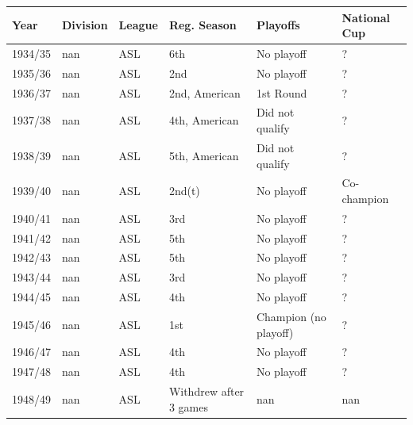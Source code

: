 \documentclass{article}
\begin{document}
\begin{tabular}{llllll}
\toprule
Year & Division & League & Reg. Season & Playoffs & National Cup \\
\midrule
1934/35 & nan & ASL & 6th & No playoff & ? \\
1935/36 & nan & ASL & 2nd & No playoff & ? \\
1936/37 & nan & ASL & 2nd, American & 1st Round & ? \\
1937/38 & nan & ASL & 4th, American & Did not qualify & ? \\
1938/39 & nan & ASL & 5th, American & Did not qualify & ? \\
1939/40 & nan & ASL & 2nd(t) & No playoff & Co-champion \\
1940/41 & nan & ASL & 3rd & No playoff & ? \\
1941/42 & nan & ASL & 5th & No playoff & ? \\
1942/43 & nan & ASL & 5th & No playoff & ? \\
1943/44 & nan & ASL & 3rd & No playoff & ? \\
1944/45 & nan & ASL & 4th & No playoff & ? \\
1945/46 & nan & ASL & 1st & Champion (no playoff) & ? \\
1946/47 & nan & ASL & 4th & No playoff & ? \\
1947/48 & nan & ASL & 4th & No playoff & ? \\
1948/49 & nan & ASL & Withdrew after 3 games & nan & nan \\
\bottomrule
\end{tabular}
\end{document}
